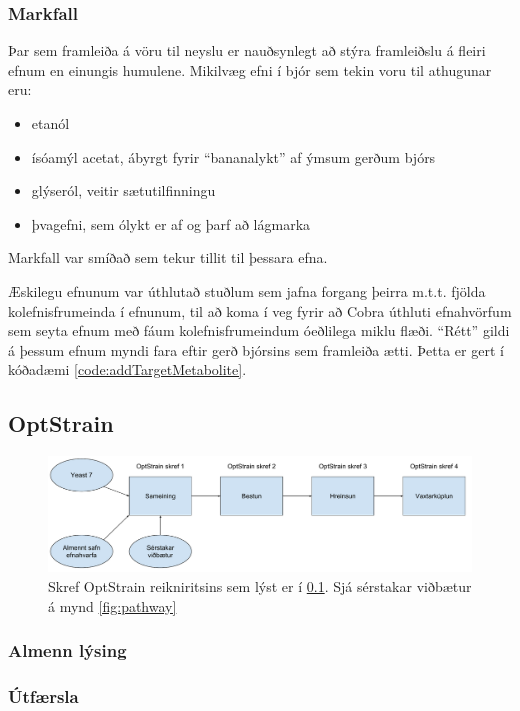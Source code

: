 \documentclass[11pt]{article}
\begin{document}
\begin{multicols}{2}
\subsubsection{Markfall}
Þar sem framleiða á vöru til neyslu er nauðsynlegt að stýra framleiðslu á fleiri efnum en einungis humulene. Mikilvæg efni í bjór \cite{dequin2001potential} sem tekin voru til athugunar eru:
\begin{itemize}
 \item etanól
 \item ísóamýl acetat, ábyrgt fyrir ``bananalykt'' af ýmsum gerðum bjórs
 \item glýseról, veitir sætutilfinningu
 \item þvagefni, sem ólykt er af og þarf að lágmarka
\end{itemize}
Markfall var smíðað sem tekur tillit til þessara efna. 

Æskilegu efnunum var úthlutað stuðlum sem jafna forgang þeirra m.t.t. fjölda kolefnisfrumeinda í efnunum, til að koma í veg fyrir að Cobra úthluti efnahvörfum sem seyta efnum með fáum kolefnisfrumeindum óeðlilega miklu flæði. ``Rétt'' gildi á þessum efnum myndi fara eftir gerð bjórsins sem framleiða ætti. Þetta er gert í kóðadæmi \ref{code:addTargetMetabolite}.

\subsection{OptStrain}
\label{sec:optstrain}
\begin{figure}
\caption[OptStrain reikniritið]{Skref OptStrain reikniritsins sem lýst er í \ref{sec:optstrain}. Sjá sérstakar viðbætur á mynd \ref{fig:pathway}}
\label{fig:flaedirit}
\includegraphics[width=\linewidth]{Pics/OptStrainOverview}
\end{figure}
\subsubsection{Almenn lýsing}
\subsubsection{Útfærsla}


\end{multicols}
\end{document}
